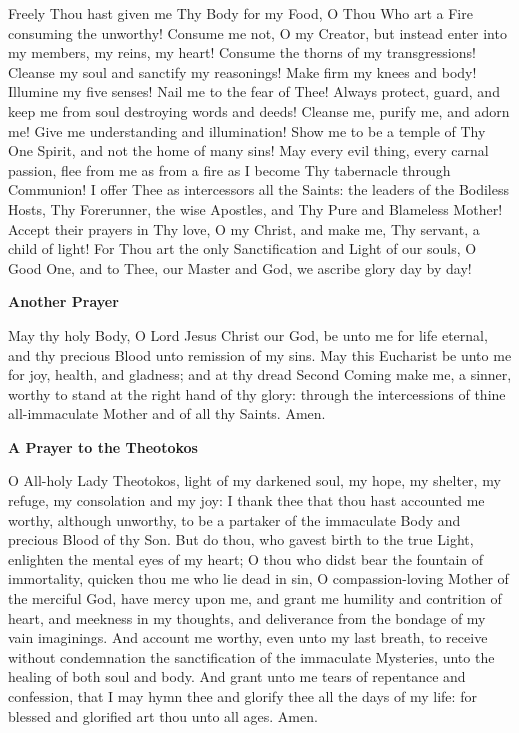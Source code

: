 Freely Thou hast given me Thy Body for my Food, O Thou Who art a Fire consuming the unworthy! Consume me not, O my Creator, but instead enter into my members, my reins, my heart! Consume the thorns of my transgressions! Cleanse my soul and sanctify my reasonings! Make firm my knees and body! Illumine my five senses! Nail me to the fear of Thee! Always protect, guard, and keep me from soul destroying words and deeds! Cleanse me, purify me, and adorn me! Give me understanding and illumination! Show me to be a temple of Thy One Spirit, and not the home of many sins! May every evil thing, every carnal passion, flee from me as from a fire as I become Thy tabernacle through Communion! I offer Thee as intercessors all the Saints: the leaders of the Bodiless Hosts, Thy Forerunner, the wise Apostles, and Thy Pure and Blameless Mother! Accept their prayers in Thy love, O my Christ, and make me, Thy servant, a child of light! For Thou art the only Sanctification and Light of our souls, O Good One, and to Thee, our Master and God, we ascribe glory day by day!

\begin{center}
	\textbf{Another Prayer}
\end{center}

May thy holy Body, O Lord Jesus Christ our God, be unto me for life eternal, and thy precious Blood unto remission of my sins. May this Eucharist be unto me for joy, health, and gladness; and at thy dread Second Coming make me, a sinner, worthy to stand at the right hand of thy glory: through the intercessions of thine all-immaculate Mother and of all thy Saints.  Amen.

\begin{center}
	\textbf{A Prayer to the Theotokos}
\end{center}

O  All-holy Lady Theotokos, light of my darkened soul, my hope, my shelter, my refuge, my consolation and my joy: I thank thee that thou hast accounted me worthy, although unworthy, to be a partaker of the immaculate Body and precious Blood of thy Son. But do thou, who gavest birth to the true Light, enlighten the mental eyes of my heart; O thou who didst bear the fountain of immortality, quicken thou me who lie dead in sin, O compassion-loving Mother of the merciful God, have mercy upon me, and grant me humility and contrition of heart, and meekness in my thoughts, and deliverance from the bondage of my vain imaginings. And account me worthy, even unto my last breath, to receive without condemnation the sanctification of the immaculate Mysteries, unto the healing of both soul and body. And grant unto me tears of repentance and confession, that I may hymn thee and glorify thee all the days of my life: for blessed and glorified art thou unto all ages.  Amen.

